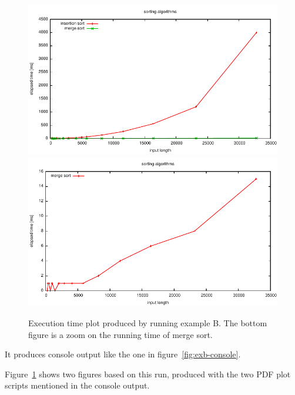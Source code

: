 \documentclass[a4paper,10pt]{article}
\begin{document}
\begin{figure}
  \centering
  \includegraphics[width=0.8\columnwidth]{plot-ExampleB-all.pdf}\\
  \includegraphics[width=0.8\columnwidth]{plot-ExampleB-zoom.pdf}
  \caption{
    Execution time plot produced by running example B.
    The bottom figure is a zoom on the running time of merge sort.
  }\label{fig:exb-plot}
\end{figure}

It produces console output like the one in figure~\ref{fig:exb-console}.

Figure~\ref{fig:exb-plot} shows two figures based on this run, produced with the two PDF plot scripts mentioned in the console output.

\cite{wikipedia:merge-sort,wikipedia:insertion-sort,wikipedia:bubble-sort}



\footnotesize


\end{document}
